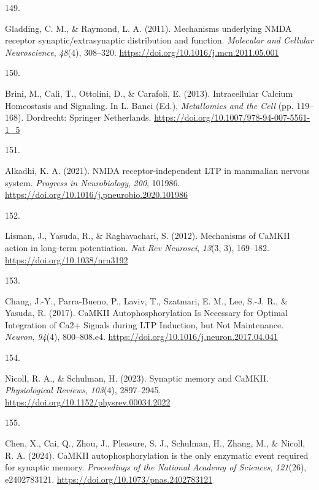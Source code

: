 \documentclass[
  11pt,
  letterpaper,
]{scrreprt}
\newlength{\cslhangindent}
\newlength{\csllabelwidth}
\newenvironment{CSLReferences}[2] %
 {\begin{list}{}{%
  \setlength{\itemindent}{0pt}
  \setlength{\leftmargin}{0pt}
  \setlength{\parsep}{0pt}
  \ifodd #1
   \setlength{\leftmargin}{\cslhangindent}
   \setlength{\itemindent}{-1\cslhangindent}
  \fi
  \setlength{\itemsep}{#2\baselineskip}}}
 {\end{list}}
\newcommand{\CSLLeftMargin}[1]{\parbox[t]{\csllabelwidth}{\strut#1\strut}}
\newcommand{\CSLRightInline}[1]{\parbox[t]{\linewidth - \csllabelwidth}{\strut#1\strut}}
\begin{document}
\begin{CSLReferences}{0}{0}
\CSLLeftMargin{149. }%
\CSLRightInline{Gladding, C. M., \& Raymond, L. A. (2011). Mechanisms
underlying {NMDA} receptor synaptic/extrasynaptic distribution and
function. \emph{Molecular and Cellular Neuroscience}, \emph{48}(4),
308--320. \url{https://doi.org/10.1016/j.mcn.2011.05.001}}

\CSLLeftMargin{150. }%
\CSLRightInline{Brini, M., Calì, T., Ottolini, D., \& Carafoli, E.
(2013). Intracellular {Calcium Homeostasis} and {Signaling}. In L. Banci
(Ed.), \emph{Metallomics and the {Cell}} (pp. 119--168). Dordrecht:
Springer Netherlands. \url{https://doi.org/10.1007/978-94-007-5561-1_5}}

\CSLLeftMargin{151. }%
\CSLRightInline{Alkadhi, K. A. (2021). {NMDA} receptor-independent {LTP}
in mammalian nervous system. \emph{Progress in Neurobiology},
\emph{200}, 101986.
\url{https://doi.org/10.1016/j.pneurobio.2020.101986}}

\CSLLeftMargin{152. }%
\CSLRightInline{Lisman, J., Yasuda, R., \& Raghavachari, S. (2012).
Mechanisms of {CaMKII} action in long-term potentiation. \emph{Nat Rev
Neurosci}, \emph{13}(3, 3), 169--182.
\url{https://doi.org/10.1038/nrn3192}}

\CSLLeftMargin{153. }%
\CSLRightInline{Chang, J.-Y., Parra-Bueno, P., Laviv, T., Szatmari, E.
M., Lee, S.-J. R., \& Yasuda, R. (2017). {CaMKII Autophosphorylation Is
Necessary} for {Optimal Integration} of {Ca2}+ {Signals} during {LTP
Induction}, but {Not Maintenance}. \emph{Neuron}, \emph{94}(4),
800--808.e4. \url{https://doi.org/10.1016/j.neuron.2017.04.041}}

\CSLLeftMargin{154. }%
\CSLRightInline{Nicoll, R. A., \& Schulman, H. (2023). Synaptic memory
and {CaMKII}. \emph{Physiological Reviews}, \emph{103}(4), 2897--2945.
\url{https://doi.org/10.1152/physrev.00034.2022}}

\CSLLeftMargin{155. }%
\CSLRightInline{Chen, X., Cai, Q., Zhou, J., Pleasure, S. J., Schulman,
H., Zhang, M., \& Nicoll, R. A. (2024). {CaMKII} autophosphorylation is
the only enzymatic event required for synaptic memory. \emph{Proceedings
of the National Academy of Sciences}, \emph{121}(26), e2402783121.
\url{https://doi.org/10.1073/pnas.2402783121}}


\end{CSLReferences}
\end{document}
